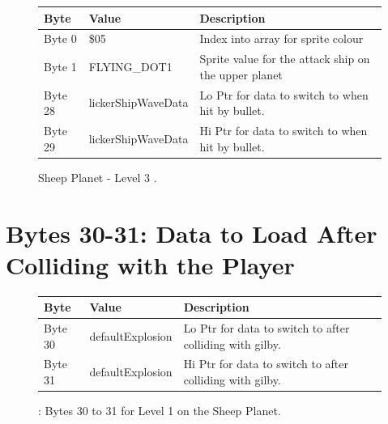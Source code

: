 \begin{figure}[H]
  {
  \setlength{\tabcolsep}{3.0pt}
  \setlength\cmidrulewidth{\heavyrulewidth} %
  \begin{adjustbox}{width=12cm}

\begin{tabular}{lll}
\toprule
 Byte    & Value                     & Description                                                        \\
\midrule
 Byte 0  & \$05                       & Index into array for sprite colour                                  \\
 Byte 1  & FLYING\_DOT1               & Sprite value for the attack ship on the upper planet\index{planet}               \\
 Byte 28 & lickerShipWaveData\index{lickerShipWaveData}         & Lo Ptr for data to switch to when hit by bullet.                                    \\
 Byte 29 & lickerShipWaveData\index{lickerShipWaveData}         & Hi Ptr for data to switch to when hit by bullet.                                    \\
\bottomrule
\end{tabular}

  \end{adjustbox}

  }\caption{Sheep Planet - Level 3
.}
\end{figure}

\section{Bytes 30-31: Data to Load After Colliding with the Player}
\begin{figure}[H]

  {
    \setlength{\tabcolsep}{3.0pt}
    \setlength\cmidrulewidth{\heavyrulewidth} %
    \begin{adjustbox}{width=13cm}

      \begin{tabular}{lll}
        \toprule
        Byte    & Value                     & Description                                                        \\
        \midrule
 Byte 30 & defaultExplosion\index{defaultExplosion}          & Lo Ptr for data to switch to after colliding\index{colliding} with gilby.                \\
 Byte 31 & defaultExplosion\index{defaultExplosion}          & Hi Ptr for data to switch to after colliding\index{colliding} with gilby.                \\
        \bottomrule
      \end{tabular}
    \end{adjustbox}
  }\caption{: Bytes 30 to 31 for Level 1 on the Sheep Planet.}
\end{figure}

